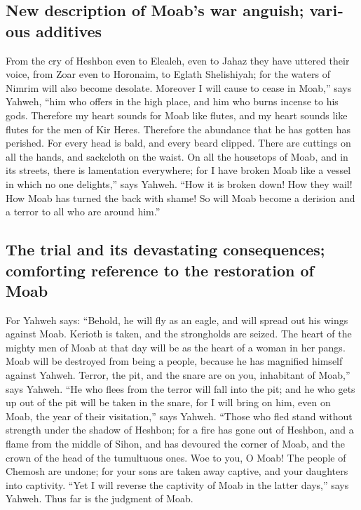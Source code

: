 \begin{paracol}{2}
\begin{otherlanguage}{english}
\hypertarget{new-description-of-moabs-war-anguish-various-additives}{%
\subsection{New description of Moab's war anguish; various
additives}\label{new-description-of-moabs-war-anguish-various-additives}}

 From the cry of Heshbon even to Elealeh, even to Jahaz
they have uttered their voice, from Zoar even to Horonaim, to Eglath
Shelishiyah; for the waters of Nimrim will also become desolate.
 Moreover I will cause to cease in Moab,'' says Yahweh,
``him who offers in the high place, and him who burns incense to his
gods.  Therefore my heart sounds for Moab like flutes,
and my heart sounds like flutes for the men of Kir Heres. Therefore the
abundance that he has gotten has perished.  For every
head is bald, and every beard clipped. There are cuttings on all the
hands, and sackcloth on the waist.  On all the housetops
of Moab, and in its streets, there is lamentation everywhere; for I have
broken Moab like a vessel in which no one delights,'' says Yahweh.
 ``How it is broken down! How they wail! How Moab has
turned the back with shame! So will Moab become a derision and a terror
to all who are around him.''

\hypertarget{the-trial-and-its-devastating-consequences-comforting-reference-to-the-restoration-of-moab}{%
\subsection{The trial and its devastating consequences; comforting
reference to the restoration of
Moab}\label{the-trial-and-its-devastating-consequences-comforting-reference-to-the-restoration-of-moab}}

 For Yahweh says: ``Behold, he will fly as an eagle, and
will spread out his wings against Moab.  Kerioth is
taken, and the strongholds are seized. The heart of the mighty men of
Moab at that day will be as the heart of a woman in her pangs.
 Moab will be destroyed from being a people, because he
has magnified himself against Yahweh.  Terror, the pit,
and the snare are on you, inhabitant of Moab,'' says Yahweh.
 ``He who flees from the terror will fall into the pit;
and he who gets up out of the pit will be taken in the snare, for I will
bring on him, even on Moab, the year of their visitation,'' says Yahweh.
 ``Those who fled stand without strength under the shadow
of Heshbon; for a fire has gone out of Heshbon, and a flame from the
middle of Sihon, and has devoured the corner of Moab, and the crown of
the head of the tumultuous ones.  Woe to you, O Moab! The
people of Chemosh are undone; for your sons are taken away captive, and
your daughters into captivity.  ``Yet I will reverse the
captivity of Moab in the latter days,'' says Yahweh. Thus far is the
judgment of Moab.


\end{otherlanguage}
\end{paracol}
